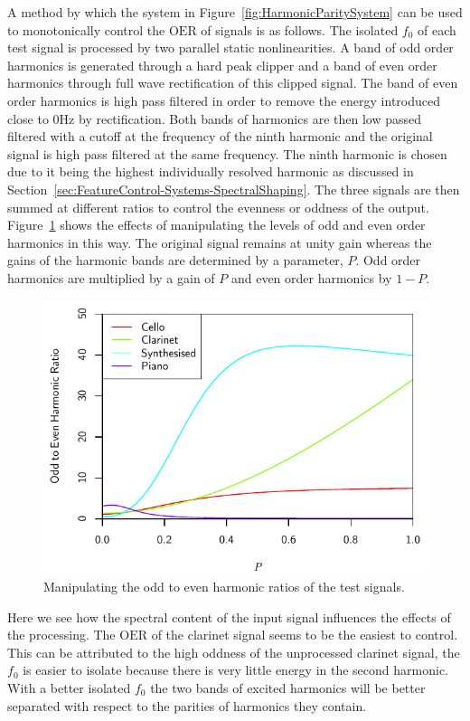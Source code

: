 		A method by which the system in Figure~\ref{fig:HarmonicParitySystem} can be used to monotonically control
		the $\mathrm{OER}$ of signals is as follows. The isolated $f_{0}$ of each test signal is processed by two
		parallel static nonlinearities. A band of odd order harmonics is generated through a hard peak clipper and
		a band of even order harmonics through full wave rectification of this clipped signal. The band of even
		order harmonics is high pass filtered in order to remove the energy introduced close to 0Hz by
		rectification.  Both bands of harmonics are then low passed filtered with a cutoff at the frequency of the
		ninth harmonic and the original signal is high pass filtered at the same frequency. The ninth harmonic is
		chosen due to it being the highest individually resolved harmonic as discussed in
		Section~\ref{sec:FeatureControl-Systems-SpectralShaping}. The three signals are then summed at different
		ratios to control the evenness or oddness of the output.  Figure~\ref{fig:MoveParities} shows the effects
		of manipulating the levels of odd and even order harmonics in this way. The original signal remains at
		unity gain whereas the gains of the harmonic bands are determined by a parameter, $P$.  Odd order harmonics
		are multiplied by a gain of $P$ and even order harmonics by $1 - P$.

		\begin{figure}[h!]
			\centering
			\includegraphics{chapter6/Images/MoveParities.pdf}
			\caption{Manipulating the odd to even harmonic ratios of the test signals.}
			\label{fig:MoveParities}
		\end{figure}

		Here we see how the spectral content of the input signal influences the effects of the processing.  The
		$\mathrm{OER}$ of the clarinet signal seems to be the easiest to control. This can be attributed to the
		high oddness of the unprocessed clarinet signal, the $f_{0}$ is easier to isolate because there is very
		little energy in the second harmonic. With a better isolated $f_{0}$ the two bands of excited harmonics
		will be better separated with respect to the parities of harmonics they contain.


